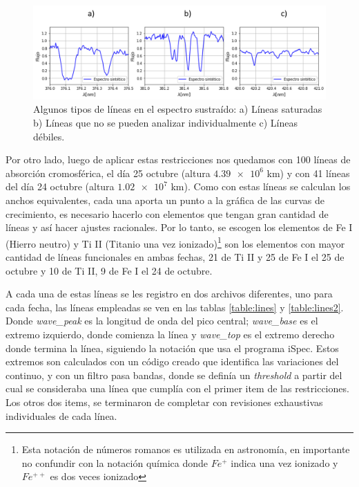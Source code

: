 \documentclass[12pt,oneside,openany,letter]{book}
\begin{document}
\begin{figure}
    \centering
    \includegraphics[width=1\linewidth]{Gaficas/examples_lines.png}
    \caption{Algunos tipos de líneas en el espectro sustraído: a) Líneas saturadas b) Líneas que no se pueden analizar individualmente c) Líneas débiles.}
    \label{fig:example_lines}
\end{figure}

Por otro lado, luego de aplicar estas restricciones nos quedamos con 100 líneas de absorción cromosférica, el día 25 octubre (altura $\num{4.39e6}$ km) y con 41 líneas del día 24 octubre (altura $\num{1.02e7}$ km). Como con estas líneas se calculan los anchos equivalentes, cada una aporta un punto a la gráfica de las curvas de crecimiento, es necesario hacerlo con elementos que tengan gran cantidad de líneas y así hacer ajustes racionales. Por lo tanto, se escogen los elementos de Fe I (Hierro neutro) y Ti II  (Titanio una vez ionizado)\footnote{Esta notación de números romanos es utilizada en astronomía, en importante no confundir con la notación química donde $Fe^{+}$ indica una vez ionizado y $Fe^{++}$ es dos veces ionizado} son los elementos con mayor cantidad de líneas funcionales en ambas fechas, 21 de Ti II y 25 de Fe I el 25 de octubre y 10 de Ti II, 9 de Fe I el 24 de octubre. 

A cada una de estas líneas se les registro en dos archivos diferentes, uno para cada fecha, las líneas empleadas se ven en las tablas \ref{table:lines} y \ref{table:lines2}. Donde \textit{wave\_peak} es la longitud de onda del pico central; \textit{wave\_base} es el extremo izquierdo, donde comienza la línea y \textit{wave\_top} es el extremo derecho donde termina la línea, siguiendo la notación que usa el programa iSpec. Estos extremos son calculados con un código creado que identifica las variaciones del continuo, y con un filtro pasa bandas, donde se definía un \textit{threshold} a partir del cual se consideraba una línea que cumplía con el primer item de las restricciones. Los otros dos items, se terminaron de completar con revisiones exhaustivas individuales de cada línea.
\end{document}
